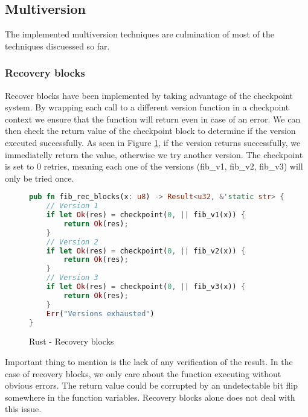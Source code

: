 \subsection{Multiversion}

The implemented multiversion techniques are culmination of most of the techniques discuessed so far.

\subsubsection{Recovery blocks}

Recover blocks have been implemented by taking advantage of the checkpoint system. By wrapping each call to a different version function in a checkpoint context we ensure that the function will return even in case of an error. We can then check the return value of the checkpoint block to determine if the version executed successfully. As seen in Figure \ref{fig:recover_blocks}, if the version returns successfully, we immediatelly return the value, otherwise we try another version. The checkpoint is set to 0 retries, meaning each one of the versions (fib\_v1, fib\_v2, fib\_v3) will only be tried once.

\begin{figure}[!h]
\begin{lstlisting}[language=Rust]
pub fn fib_rec_blocks(x: u8) -> Result<u32, &'static str> {
    // Version 1
    if let Ok(res) = checkpoint(0, || fib_v1(x)) {
        return Ok(res);
    }
    // Version 2
    if let Ok(res) = checkpoint(0, || fib_v2(x)) {
        return Ok(res);
    }
    // Version 3
    if let Ok(res) = checkpoint(0, || fib_v3(x)) {
        return Ok(res);
    }
    Err("Versions exhausted")
}
\end{lstlisting}
\caption{Rust - Recovery blocks}
\label{fig:recover_blocks}
\end{figure}

Important thing to mention is the lack of any verification of the result. In the case of recovery blocks, we only care about the function executing without obvious errors. The return value could be corrupted by an undetectable bit flip somewhere in the function variables. Recovery blocks alone does not deal with this issue.